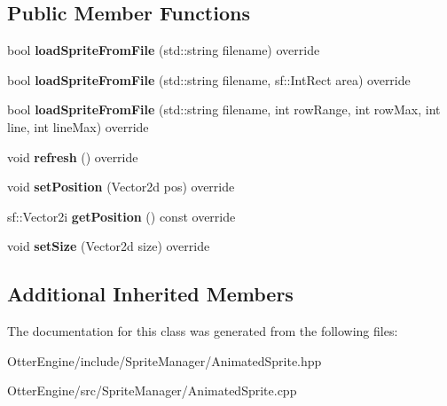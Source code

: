 \subsection*{Public Member Functions}
\begin{DoxyCompactItemize}
\item 
bool {\bfseries load\+Sprite\+From\+File} (std\+::string filename) override\hypertarget{class_otter_engine_1_1_animated_sprite_a3e01ef573316302a20bcd5209ce1c87b}{}\label{class_otter_engine_1_1_animated_sprite_a3e01ef573316302a20bcd5209ce1c87b}

\item 
bool {\bfseries load\+Sprite\+From\+File} (std\+::string filename, sf\+::\+Int\+Rect area) override\hypertarget{class_otter_engine_1_1_animated_sprite_a6e897cabaa0d4d4585a444d0d65ab481}{}\label{class_otter_engine_1_1_animated_sprite_a6e897cabaa0d4d4585a444d0d65ab481}

\item 
bool {\bfseries load\+Sprite\+From\+File} (std\+::string filename, int row\+Range, int row\+Max, int line, int line\+Max) override\hypertarget{class_otter_engine_1_1_animated_sprite_a21a0f079fc4e85d6f7777b7dd117ec33}{}\label{class_otter_engine_1_1_animated_sprite_a21a0f079fc4e85d6f7777b7dd117ec33}

\item 
void {\bfseries refresh} () override\hypertarget{class_otter_engine_1_1_animated_sprite_a096c99a62fc03e0916ff128915e913a7}{}\label{class_otter_engine_1_1_animated_sprite_a096c99a62fc03e0916ff128915e913a7}

\item 
void {\bfseries set\+Position} (Vector2d pos) override\hypertarget{class_otter_engine_1_1_animated_sprite_af344642a0d078fc97a00eb2f8eb607ee}{}\label{class_otter_engine_1_1_animated_sprite_af344642a0d078fc97a00eb2f8eb607ee}

\item 
sf\+::\+Vector2i {\bfseries get\+Position} () const override\hypertarget{class_otter_engine_1_1_animated_sprite_ae1814550b12f83db32afba94aacb11c3}{}\label{class_otter_engine_1_1_animated_sprite_ae1814550b12f83db32afba94aacb11c3}

\item 
void {\bfseries set\+Size} (Vector2d size) override\hypertarget{class_otter_engine_1_1_animated_sprite_a0a1509b4e17b90663bb819dd823c80a5}{}\label{class_otter_engine_1_1_animated_sprite_a0a1509b4e17b90663bb819dd823c80a5}

\end{DoxyCompactItemize}
\subsection*{Additional Inherited Members}


The documentation for this class was generated from the following files\+:\begin{DoxyCompactItemize}
\item 
Otter\+Engine/include/\+Sprite\+Manager/Animated\+Sprite.\+hpp\item 
Otter\+Engine/src/\+Sprite\+Manager/Animated\+Sprite.\+cpp\end{DoxyCompactItemize}
